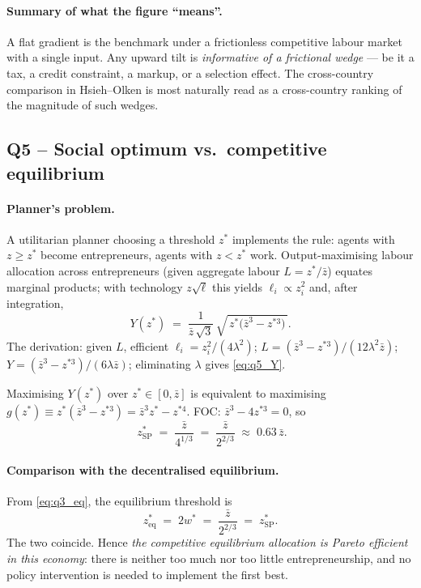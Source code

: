 \documentclass[11pt,a4paper]{article}
\begin{document}
\paragraph{Summary of what the figure ``means''.}
A flat gradient is the benchmark under a frictionless competitive labour market with a single input. Any upward tilt is \emph{informative of a frictional wedge} --- be it a tax, a credit constraint, a markup, or a selection effect. The cross-country comparison in Hsieh--Olken is most naturally read as a cross-country ranking of the magnitude of such wedges.

\subsection*{Q5 -- Social optimum vs.\ competitive equilibrium}

\paragraph{Planner's problem.}
A utilitarian planner choosing a threshold $z^{*}$ implements the rule: agents with $z\ge z^{*}$ become entrepreneurs, agents with $z<z^{*}$ work. Output-maximising labour allocation across entrepreneurs (given aggregate labour $L=z^{*}/\bar z$) equates marginal products; with technology $z\sqrt{\ell}$ this yields $\ell_{i}\propto z_{i}^{2}$ and, after integration,
\begin{equation}
Y(z^{*})\;=\;\frac{1}{\bar z\,\sqrt{3}}\,\sqrt{\,z^{*}\bigl(\bar z^{3}-z^{*3}\bigr)\,}.
\label{eq:q5_Y}
\end{equation}
The derivation: given $L$, efficient $\ell_{i}=z_{i}^{2}/(4\lambda^{2})$; $L=(\bar z^{3}-z^{*3})/(12\lambda^{2}\bar z)$; $Y=(\bar z^{3}-z^{*3})/(6\lambda\bar z)$; eliminating $\lambda$ gives \eqref{eq:q5_Y}.

Maximising $Y(z^{*})$ over $z^{*}\in[0,\bar z]$ is equivalent to maximising $g(z^{*})\equiv z^{*}(\bar z^{3}-z^{*3})=\bar z^{3}z^{*}-z^{*4}$. FOC: $\bar z^{3}-4z^{*3}=0$, so
\begin{equation}
\boxed{\;z^{*}_{\text{SP}}\;=\;\frac{\bar z}{4^{1/3}}\;=\;\frac{\bar z}{2^{2/3}}\;\approx\;0.63\,\bar z.}
\label{eq:q5_zSP}
\end{equation}

\paragraph{Comparison with the decentralised equilibrium.}
From \eqref{eq:q3_eq}, the equilibrium threshold is
\[
z^{*}_{\text{eq}}\;=\;2w^{*}\;=\;\frac{\bar z}{2^{2/3}}\;=\;z^{*}_{\text{SP}}.
\]
The two coincide. Hence \emph{the competitive equilibrium allocation is Pareto efficient in this economy}: there is neither too much nor too little entrepreneurship, and no policy intervention is needed to implement the first best.
\end{document}
